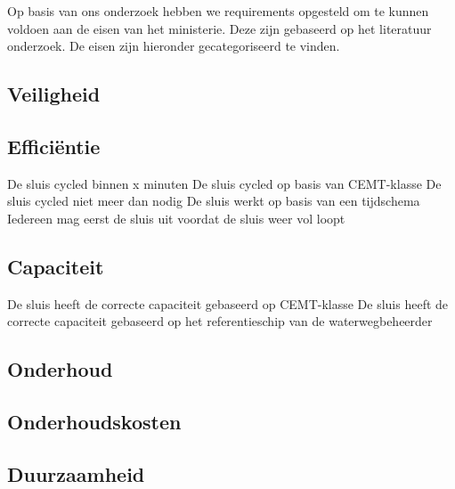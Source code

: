 \documentclass[../verslag.tex]{subfiles}
\begin{document}
Op basis van ons onderzoek hebben we requirements opgesteld om te kunnen voldoen aan de eisen van het ministerie. Deze zijn gebaseerd op het literatuur onderzoek. De eisen zijn hieronder gecategoriseerd te vinden.

\subsection{Veiligheid}

\subsection{Efficiëntie}
De sluis cycled binnen x minuten
De sluis cycled op basis van CEMT-klasse
De sluis cycled niet meer dan nodig
De sluis werkt op basis van een tijdschema
Iedereen mag eerst de sluis uit voordat de sluis weer vol loopt

\subsection{Capaciteit}
De sluis heeft de correcte capaciteit gebaseerd op CEMT-klasse
De sluis heeft de correcte capaciteit gebaseerd op het referentieschip van de waterwegbeheerder

\subsection{Onderhoud}

\subsection{Onderhoudskosten}

\subsection{Duurzaamheid}
\end{document}
